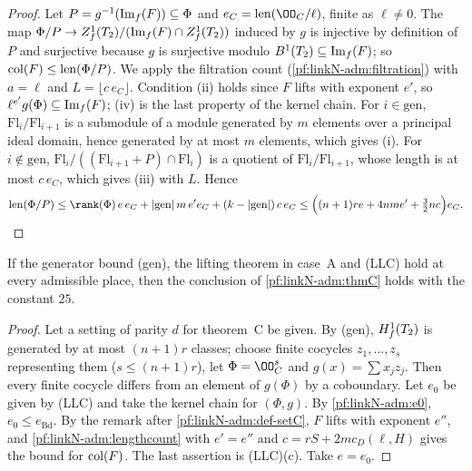 \begin{proof}
Let $P=g^{-1}(\operatorname{Im}_f(F))\subseteq\Phi$ and $e_C=\linkNadmlen(\OO_C/\ell)$, finite as $\ell\ne0$. The map
$\Phi/P\to Z^1_{f}(T_2)/(\operatorname{Im}_f(F)\cap Z^1_{f}(T_2))$ induced by $g$ is injective by definition of $P$ and surjective
because $g$ is surjective modulo $B^1(T_2)\subseteq\operatorname{Im}_f(F)$; so $\operatorname{col}(F)\le\operatorname{len}(\Phi/P)$. We apply the
filtration count (\cref{pf:linkN-adm:filtration}) with $a=\ell$ and $L=\lfloor c\,e_C\rfloor$. Condition (ii) holds since $F$ lifts
with exponent $e'$, so $\ell^{e'}g(\Phi)\subseteq\operatorname{Im}_f(F)$; (iv) is the last property of the kernel chain. For
$i\in\mathrm{gen}$, $\mathrm{Fl}_i/\mathrm{Fl}_{i+1}$ is a submodule of a module generated by $m$ elements over a principal ideal
domain, hence generated by at most $m$ elements, which gives (i). For $i\notin\mathrm{gen}$,
$\mathrm{Fl}_i/((\mathrm{Fl}_{i+1}+P)\cap\mathrm{Fl}_i)$ is a quotient of $\mathrm{Fl}_i/\mathrm{Fl}_{i+1}$, whose length is at most
$c\,e_C$, which gives (iii) with $L$. Hence
\[
\linkNadmlen(\Phi/P)\le\rank(\Phi)\,e\,e_C+|\mathrm{gen}|\,m\,e'e_C+(k-|\mathrm{gen}|)\,c\,e_C\le
\Bigl((n+1)re+4nme'+\tfrac32nc\Bigr)e_C .\qedhere
\]
\end{proof}

\begin{proposition}\label{pf:linkN-adm:thmCLLC}
If the generator bound (gen), the lifting theorem in case~A and (LLC) hold at every admissible place, then the conclusion
of \cref{pf:linkN-adm:thmC} holds with the constant $25$.
\end{proposition}

\begin{proof}
Let a setting of parity $d$ for theorem~C be given. By (gen), $H^1_{f}(T_2)$ is generated by at most $(n+1)r$ classes;
choose finite cocycles $z_1,\dots,z_s$ representing them ($s\le(n+1)r$), let $\Phi=\OO_C^s$ and $g(x)=\sum x_jz_j$. Then every
finite cocycle differs from an element of $g(\Phi)$ by a coboundary. Let $e_0$ be given by (LLC) and take the kernel chain
for $(\Phi,g)$. By \cref{pf:linkN-adm:e0}, $e_0\le e_{\mathrm{Bd}}$. By the remark after \cref{pf:linkN-adm:def-setC}, $F$
lifts with exponent $e''$, and \cref{pf:linkN-adm:lengthcount} with $e'=e''$ and $c=rS+2mc_D(\ell,H)$ gives the bound for
$\operatorname{col}(F)$. The last assertion is (LLC)(c). Take $e=e_0$.
\end{proof}

